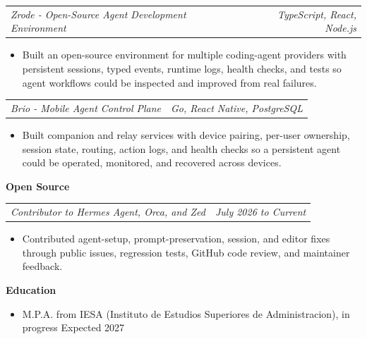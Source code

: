 \documentclass[10pt,letterpaper]{article}
\makeatletter
\newcommand{\bodyfont}{\fontsize{10.5}{15.75}\selectfont}
\newcommand{\sectiontitle}[1]{%
  \vspace{4pt}
  {\bodyfont\textbf{#1}}\par
  \nopagebreak[4]
  \vspace{2pt}
}
\newcommand{\roleline}[2]{%
  \begin{tabularx}{\textwidth}{@{}Xr@{}}
    \bodyfont\textit{#1} & \bodyfont\textit{#2}
  \end{tabularx}
  \nopagebreak[4]
  \vspace{1pt}
}
\makeatother
\begin{document}
\vspace{3pt}
\roleline{Zrode - Open-Source Agent Development Environment}{TypeScript, React, Node.js}
\begin{itemize}
  \item Built an open-source environment for multiple coding-agent providers with persistent sessions, typed events, runtime logs, health checks, and tests so agent workflows could be inspected and improved from real failures.
\end{itemize}

\vspace{3pt}
\roleline{Brio - Mobile Agent Control Plane}{Go, React Native, PostgreSQL}
\begin{itemize}
  \item Built companion and relay services with device pairing, per-user ownership, session state, routing, action logs, and health checks so a persistent agent could be operated, monitored, and recovered across devices.
\end{itemize}

\sectiontitle{Open Source}

\roleline{Contributor to Hermes Agent, Orca, and Zed}{July 2026 to Current}
\begin{itemize}
  \item Contributed agent-setup, prompt-preservation, session, and editor fixes through public issues, regression tests, GitHub code review, and maintainer feedback.
\end{itemize}

\sectiontitle{Education}
\begin{itemize}
  \item M.P.A. from IESA (Instituto de Estudios Superiores de Administracion), in progress \hfill Expected 2027
\end{itemize}
\end{document}

